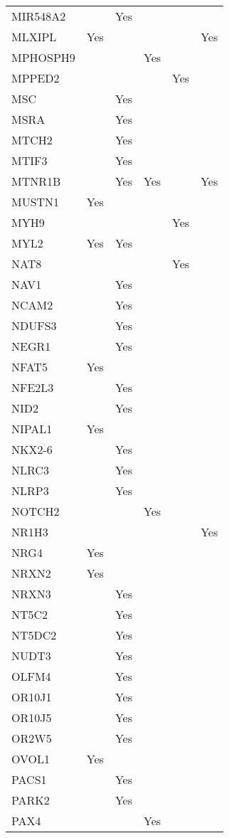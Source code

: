 \documentclass[]{report}
\begin{document}
\begin{longtable}[t]{llllll}
MIR548A2 &  & Yes &  &  & \\
MLXIPL & Yes &  &  &  & Yes\\
MPHOSPH9 &  &  & Yes &  & \\
MPPED2 &  &  &  & Yes & \\
MSC &  & Yes &  &  & \\
MSRA &  & Yes &  &  & \\
MTCH2 &  & Yes &  &  & \\
MTIF3 &  & Yes &  &  & \\
MTNR1B &  & Yes & Yes &  & Yes\\
MUSTN1 & Yes &  &  &  & \\
MYH9 &  &  &  & Yes & \\
MYL2 & Yes & Yes &  &  & \\
NAT8 &  &  &  & Yes & \\
NAV1 &  & Yes &  &  & \\
NCAM2 &  & Yes &  &  & \\
NDUFS3 &  & Yes &  &  & \\
NEGR1 &  & Yes &  &  & \\
NFAT5 & Yes &  &  &  & \\
NFE2L3 &  & Yes &  &  & \\
NID2 &  & Yes &  &  & \\
NIPAL1 & Yes &  &  &  & \\
NKX2-6 &  & Yes &  &  & \\
NLRC3 &  & Yes &  &  & \\
NLRP3 &  & Yes &  &  & \\
NOTCH2 &  &  & Yes &  & \\
NR1H3 &  &  &  &  & Yes\\
NRG4 & Yes &  &  &  & \\
NRXN2 & Yes &  &  &  & \\
NRXN3 &  & Yes &  &  & \\
NT5C2 &  & Yes &  &  & \\
NT5DC2 &  & Yes &  &  & \\
NUDT3 &  & Yes &  &  & \\
OLFM4 &  & Yes &  &  & \\
OR10J1 &  & Yes &  &  & \\
OR10J5 &  & Yes &  &  & \\
OR2W5 &  & Yes &  &  & \\
OVOL1 & Yes &  &  &  & \\
PACS1 &  & Yes &  &  & \\
PARK2 &  & Yes &  &  & \\
PAX4 &  &  & Yes &  & \\

\end{longtable}
\end{document}
